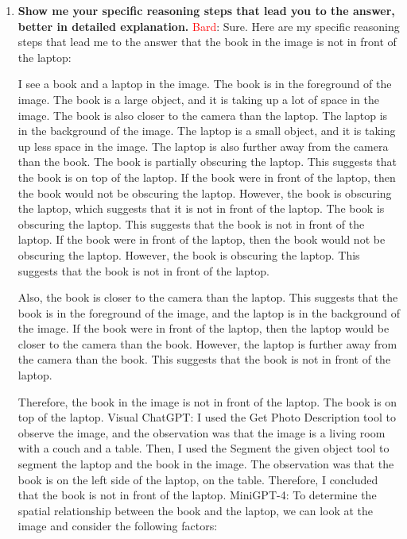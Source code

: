 \begin{enumerate}
    Therefore, the book in the image is not in front of the laptop. The book is on top of the laptop.
    \subitem Visual ChatGPT: The book is not in front of the laptop, it is on the left side of the laptop, on the table.
    \subitem MiniGPT-4: No, the book is on a coffee table next to the couch, while the laptop is on a desk in the corner of the room.
    \item \textbf{Show me your specific reasoning steps that lead you to the answer, better in detailed explanation.}
    \subitem \textcolor{Red}{Bard}: Sure. Here are my specific reasoning steps that lead me to the answer that the book in the image is not in front of the laptop:

    I see a book and a laptop in the image.
    The book is in the foreground of the image. The book is a large object, and it is taking up a lot of space in the image. The book is also closer to the camera than the laptop.
    The laptop is in the background of the image. The laptop is a small object, and it is taking up less space in the image. The laptop is also further away from the camera than the book.
    The book is partially obscuring the laptop. This suggests that the book is on top of the laptop.
    If the book were in front of the laptop, then the book would not be obscuring the laptop. However, the book is obscuring the laptop, which suggests that it is not in front of the laptop.
    The book is obscuring the laptop. This suggests that the book is not in front of the laptop. If the book were in front of the laptop, then the book would not be obscuring the laptop. However, the book is obscuring the laptop. This suggests that the book is not in front of the laptop.
    
    Also, the book is closer to the camera than the laptop. This suggests that the book is in the foreground of the image, and the laptop is in the background of the image. If the book were in front of the laptop, then the laptop would be closer to the camera than the book. However, the laptop is further away from the camera than the book. This suggests that the book is not in front of the laptop.
    
    Therefore, the book in the image is not in front of the laptop. The book is on top of the laptop.
    \subitem Visual ChatGPT: I used the Get Photo Description tool to observe the image, and the observation was that the image is a living room with a couch and a table. Then, I used the Segment the given object tool to segment the laptop and the book in the image. The observation was that the book is on the left side of the laptop, on the table. Therefore, I concluded that the book is not in front of the laptop.
    \subitem MiniGPT-4: To determine the spatial relationship between the book and the laptop, we can look at the image and consider the following factors:


\end{enumerate}
